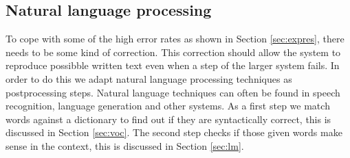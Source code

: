 \documentclass{article}
\begin{document}
\subsection{Natural language processing}
To cope with some of the high error rates as shown in Section \ref{sec:expres}, there needs to be some kind of correction. This correction should allow the system to reproduce possibble written text even when a step of the larger system fails. 
In order to do this we adapt natural language processing techniques as postprocessing steps. Natural language techniques can often be found in speech recognition, language generation and other systems. 
As a first step we match words against a dictionary to find out if they are syntactically correct, this is discussed in Section \ref{sec:voc}. The second step checks if those given words make sense in the context, this is discussed in Section \ref{sec:lm}.
\end{document}
